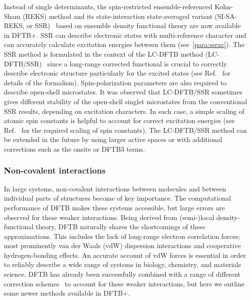 \documentclass[reprint,onecolumn,superscriptaddress]{revtex4-1}
\newcommand{\dftbp}{DFTB+}
\begin{document}
Instead of single determinants, the spin-restricted ensemble-referenced
Kohn-Sham (REKS) method and its state-interaction state-averaged variant
(SI-SA-REKS, or SSR)~\cite{Kazaryan2008, Filatov2015, Filatov2016, Filatov1999,
  Moreira2007, Filatov2017} based on ensemble density functional theory are now
available in \dftbp{}. SSR can describe electronic states with multi-reference
character and can accurately calculate excitation energies between them
(see~\ref{para:ssrxc}). The SSR method is formulated in the context of the
LC-DFTB method (LC-DFTB/SSR)~\cite{Lee19} since a long-range corrected functional
is crucial to correctly describe electronic structure particularly for the
excited states (see Ref.~\cite{Lee19} for details of the formalism).
Spin-polarization parameters are also required to describe open-shell
microstates.  It was observed that LC-DFTB/SSR sometimes gives different
stability of the open-shell singlet microstates from the conventional SSR
results, depending on excitation characters. In such case, a simple scaling of
atomic spin constants is helpful to account for correct excitation energies (see
Ref.~\cite{Lee19} for the required scaling of spin constants).  The
LC-DFTB/SSR method can be extended in the future by using larger active spaces
or with additional corrections such as the onsite or DFTB3 terms.

\subsubsection{Non-covalent interactions}

In large systems, non-covalent interactions between molecules and between
individual parts of structures become of key importance. The computational
performance of DFTB makes these systems accessible, but large errors are observed
for these weaker interactions. Being derived from (semi-)local
density-functional theory, DFTB naturally shares the shortcomings of these
approximations. This includes the lack of long-range electron correlation
forces; most prominently van der Waals (vdW) dispersion interactions and
cooperative hydrogen-bonding effects. An accurate account of vdW forces is
essential in order to reliably describe a wide range of systems in biology,
chemistry, and materials science.  DFTB has already been successfully combined
with a range of different correction schemes~\cite{elstner2001, brandenburg2014,
  mortazavi2018, Rapacioli2009, Petraglia2015, Stoehr2016} to account for these
weaker interactions, but here we outline some newer methods available in
\dftbp{}.
\end{document}
